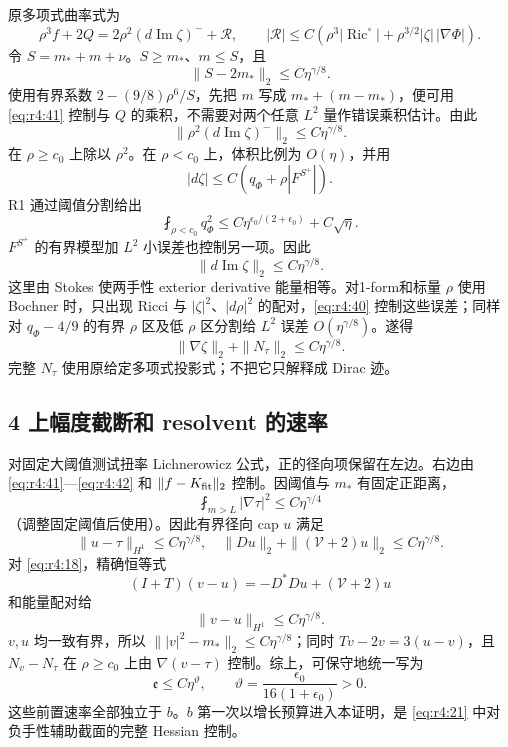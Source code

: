 \documentclass[UTF8,11pt,fontset=none]{ctexart}
\begin{document}
原多项式曲率式为 \[
\rho^3f+2Q=2\rho^2(d\operatorname{Im}\zeta)^-+\mathcal R,
\qquad
|\mathcal R|\le C\left(\rho^3|\operatorname{Ric}^{\circ}|
+\rho^{3/2}|\zeta|\,|\nabla\Phi|\right).
\] 令 \(S=m_*+m+\nu\)。\(S\ge m_*\)、\(m\le S\)，且 \[
\|S-2m_*\|_2\le C\eta^{\gamma/8}.
\] 使用有界系数 \(2-(9/8)\rho^6/S\)，先把 \(m\) 写成 \(m_*+(m-m_*)\)，便可用 \eqref{eq:r4:41} 控制与 \(Q\) 的乘积，不需要对两个任意 \(L^2\) 量作错误乘积估计。由此 \[
\|\rho^2(d\operatorname{Im}\zeta)^-\|_2\le C\eta^{\gamma/8}.
\] 在 \(\rho\ge c_0\) 上除以 \(\rho^2\)。在 \(\rho<c_0\) 上，体积比例为 \(O(\eta)\)，并用 \[
|d\zeta|\le C\left(q_\Phi+\rho|F^{S^+}|\right).
\] R1 通过阈值分割给出 \[
\fint_{\rho<c_0}q_\Phi^2
\le C\eta^{\epsilon_0/(2+\epsilon_0)}+C\sqrt\eta.
\] \(F^{S^+}\) 的有界模型加 \(L^2\) 小误差也控制另一项。因此 \[
\|d\operatorname{Im}\zeta\|_2\le C\eta^{\gamma/8}.
\] 这里由 Stokes 使两手性 exterior derivative 能量相等。对1-form和标量 \(\rho\) 使用 Bochner 时，只出现 Ricci 与 \(|\zeta|^2\)、\(|d\rho|^2\) 的配对，\eqref{eq:r4:40} 控制这些误差；同样对 \(q_\Phi-4/9\) 的有界 \(\rho\) 区及低 \(\rho\) 区分割给 \(L^2\) 误差 \(O(\eta^{\gamma/8})\)。遂得 \[
\boxed{\|\nabla\zeta\|_2+\|N_\tau\|_2\le C\eta^{\gamma/8}.}
\tag{4.43}\label{eq:r4:43}
\] 完整 \(N_\tau\) 使用原给定多项式投影式；不把它只解释成 Dirac 迹。

\subsection{4 上幅度截断和 resolvent 的速率}\label{ch4:ux4e0aux5e45ux5ea6ux622aux65adux548c-resolvent-ux7684ux901fux7387}

对固定大阈值测试扭率 Lichnerowicz 公式，正的径向项保留在左边。右边由 \eqref{eq:r4:41}---\eqref{eq:r4:42} 和 \(\|f-K_{\rm fit}\|_2\) 控制。因阈值与 \(m_*\) 有固定正距离， \[
\fint_{m>L}|\nabla\tau|^2\le C\eta^{\gamma/4}
\] （调整固定阈值后使用）。因此有界径向 cap \(u\) 满足 \[
\|u-\tau\|_{H^1}\le C\eta^{\gamma/8},
\quad \|Du\|_2+\|(\mathcal V+2)u\|_2\le C\eta^{\gamma/8}.
\] 对 \eqref{eq:r4:18}，精确恒等式 \[
(I+T)(v-u)=-D^*Du+(\mathcal V+2)u
\] 和能量配对给 \[
\|v-u\|_{H^1}\le C\eta^{\gamma/8}.
\] \(v,u\) 均一致有界，所以 \(\||v|^2-m_*\|_2\le C\eta^{\gamma/8}\)；同时 \(Tv-2v=3(u-v)\)，且 \(N_v-N_\tau\) 在 \(\rho\ge c_0\) 上由 \(\nabla(v-\tau)\) 控制。综上，可保守地统一写为 \[
\boxed{\mathfrak e\le C\eta^\vartheta,\qquad
\vartheta=\frac{\epsilon_0}{16(1+\epsilon_0)}>0.}
\tag{4.44}\label{eq:r4:44}
\] 这些前置速率全部独立于 \(b\)。\(b\) 第一次以增长预算进入本证明，是 \eqref{eq:r4:21} 中对负手性辅助截面的完整 Hessian 控制。
\end{document}
